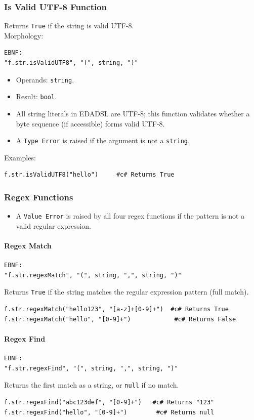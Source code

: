 \subsubsection{Is Valid UTF-8 Function}
Returns \texttt{True} if the string is valid UTF-8. \\
Morphology:
\begin{verbatim}
EBNF:
"f.str.isValidUTF8", "(", string, ")"
\end{verbatim}
\begin{itemize}
\item Operands: \texttt{string}.
\item Result: \texttt{bool}.
\item All string literals in EDADSL are UTF-8; this function validates whether a byte sequence (if accessible) forms valid UTF-8.
\item A \texttt{Type Error} is raised if the argument is not a \texttt{string}.
\end{itemize}
Examples:
\begin{verbatim}
f.str.isValidUTF8("hello")     #c# Returns True
\end{verbatim}

\subsubsection{Regex Functions}
\begin{itemize}
\item A \texttt{Value Error} is raised by all four regex functions if the pattern is not a valid regular expression.
\end{itemize}

\paragraph{Regex Match}
\begin{verbatim}
EBNF:
"f.str.regexMatch", "(", string, ",", string, ")"
\end{verbatim}
Returns \texttt{True} if the string matches the regular expression pattern (full match).
\begin{verbatim}
f.str.regexMatch("hello123", "[a-z]+[0-9]+")  #c# Returns True
f.str.regexMatch("hello", "[0-9]+")            #c# Returns False
\end{verbatim}

\paragraph{Regex Find}
\begin{verbatim}
EBNF:
"f.str.regexFind", "(", string, ",", string, ")"
\end{verbatim}
Returns the first match as a string, or \texttt{null} if no match.
\begin{verbatim}
f.str.regexFind("abc123def", "[0-9]+")   #c# Returns "123"
f.str.regexFind("hello", "[0-9]+")        #c# Returns null
\end{verbatim}


